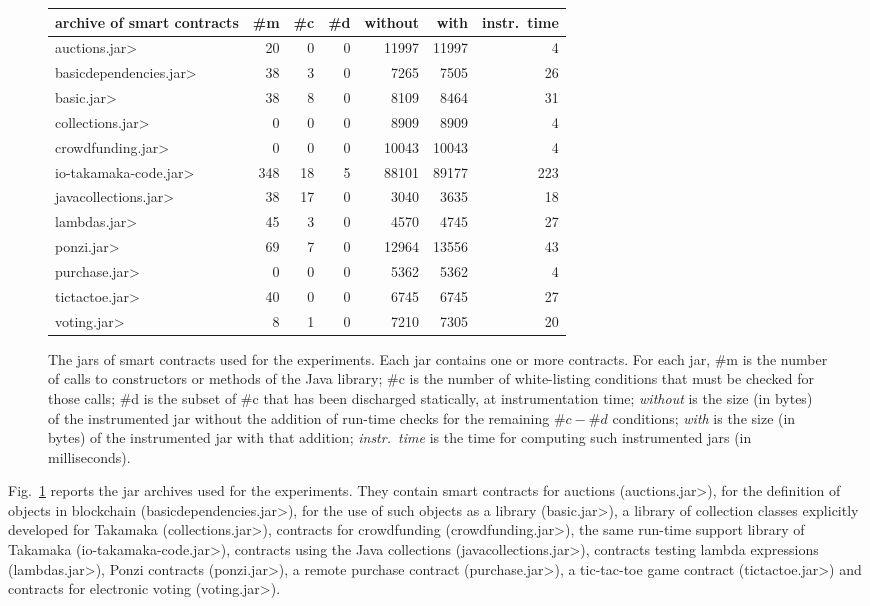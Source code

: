 \begin{figure}[t]
  \begin{center}
{\scriptsize\begin{tabular}{|l||r|r|r||r|r||r|}
  \hline
  archive of smart contracts & \#m & \#c & \#d & without & with & instr.\ time \\\hline\hline
  \<auctions.jar> & 20 & 0 & 0 & 11997 & 11997 & 4 \\\hline
  \<basicdependencies.jar> & 38 & 3 & 0 & 7265 & 7505 & 26 \\\hline
  \<basic.jar> & 38 & 8 & 0 & 8109 & 8464 & 31 \\\hline
  \<collections.jar> & 0 & 0 & 0 & 8909 & 8909 & 4 \\\hline
  \<crowdfunding.jar> & 0 & 0 & 0 & 10043 & 10043 & 4 \\\hline
  \<io-takamaka-code.jar> & 348 & 18 & 5 & 88101 & 89177 & 223 \\\hline
  \<javacollections.jar> & 38 & 17 & 0 & 3040 & 3635 & 18 \\\hline
  \<lambdas.jar> & 45 & 3 & 0 & 4570 & 4745 & 27 \\\hline
  \<ponzi.jar> & 69 & 7 & 0 & 12964 & 13556 & 43 \\\hline
  \<purchase.jar> & 0 & 0 & 0 & 5362 & 5362 & 4 \\\hline
  \<tictactoe.jar> & 40 & 0 & 0 & 6745 & 6745 & 27 \\\hline
  \<voting.jar> & 8 & 1 & 0 & 7210 & 7305 & 20 \\\hline
\end{tabular}}
  \end{center}
  \caption{The jars of smart contracts used for the experiments. Each jar
    contains one or more contracts. For each jar, \#m is the number
    of calls to constructors or methods of the Java library;
    \#c is the number of white-listing conditions that must be checked
    for those calls; \#d is the subset of \#c that has been discharged
    statically, at instrumentation time; \emph{without} is the size
    (in bytes) of the instrumented jar without the addition of run-time checks
    for the remaining $\#c - \#d$ conditions; \emph{with}
    is the size (in bytes) of the instrumented jar with that addition;
    \emph{instr.\ time} is the time for computing such instrumented jars (in milliseconds).}
  \label{fig:experiments}
  \end{figure}

Fig.~\ref{fig:experiments} reports the jar archives used for the experiments.
They contain smart contracts for auctions (\<auctions.jar>), for the definition
of objects in blockchain (\<basicdependencies.jar>), for the use of such objects
as a library (\<basic.jar>), a library of collection classes explicitly developed
for Takamaka (\<collections.jar>), contracts for crowdfunding (\<crowdfunding.jar>),
the same run-time support library of Takamaka (\<io-takamaka-code.jar>),
contracts using the Java collections (\<javacollections.jar>), contracts
testing lambda expressions (\<lambdas.jar>), Ponzi contracts
(\<ponzi.jar>), a remote purchase contract (\<purchase.jar>), a tic-tac-toe
game contract (\<tictactoe.jar>) and contracts for electronic voting (\<voting.jar>).

